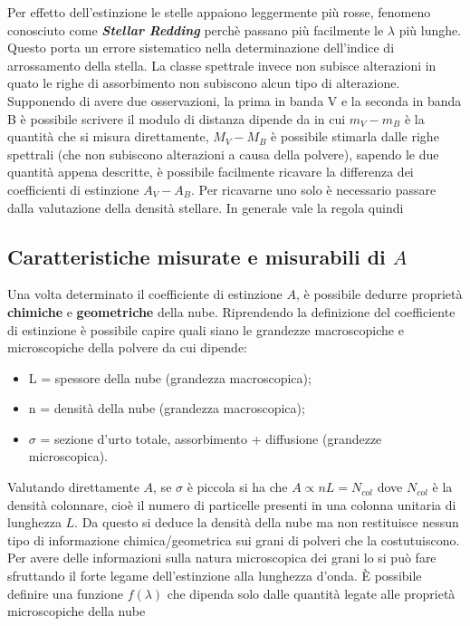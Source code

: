 Per effetto dell'estinzione le stelle appaiono leggermente pi\`u rosse, fenomeno conosciuto come \textbf{\emph{Stellar Redding}} perch\`e passano pi\`u facilmente le $\lambda$ pi\`u lunghe. Questo porta un errore sistematico nella determinazione dell'indice di arrossamento della stella. La classe spettrale invece non subisce alterazioni in quato le righe di assorbimento non subiscono alcun tipo di alterazione. Supponendo di avere due osservazioni, la prima in banda V e la seconda in banda B \`e possibile scrivere
il modulo di distanza dipende da
in cui $m_V-m_B$ \`e la quantit\`a che si misura direttamente, $M_V - M_B$ \`e possibile stimarla dalle righe spettrali (che non subiscono alterazioni a causa della polvere), sapendo le due quantit\`a appena descritte, \`e possibile facilmente ricavare la differenza dei coefficienti di estinzione $A_V-A_B$. Per ricavarne uno solo \`e necessario passare dalla valutazione della densit\`a stellare. In generale vale la regola
quindi
\subsection{Caratteristiche misurate e misurabili di $A$}
Una volta determinato il coefficiente di estinzione $A$, \`e possibile dedurre propriet\`a \textbf{chimiche} e \textbf{geometriche} della nube. Riprendendo la definizione del coefficiente di estinzione
\`e possibile capire quali siano le grandezze macroscopiche e microscopiche della polvere da cui dipende:
\begin{itemize}
		\item L = spessore della nube (grandezza macroscopica);
		\item n = densit\`a della nube (grandezza macroscopica);
		\item $\sigma$ = sezione d'urto totale, assorbimento + diffusione (grandezze microscopica).
\end{itemize}
Valutando direttamente $A$, se $\sigma$ \`e piccola si ha che $A \propto n L = N_{col}$ dove $N_{col}$ \`e la densit\`a colonnare, cio\`e il numero di particelle presenti in una colonna unitaria di lunghezza $L$. Da questo si deduce la densit\`a della nube ma non restituisce nessun tipo di informazione chimica/geometrica sui grani di polveri che la costutuiscono. Per avere delle informazioni sulla natura microscopica dei grani lo si pu\`o fare sfruttando il forte legame dell'estinzione alla lunghezza d'onda. \`E possibile definire una funzione $f(\lambda)$ che dipenda solo dalle quantit\`a legate alle propriet\`a microscopiche della nube

